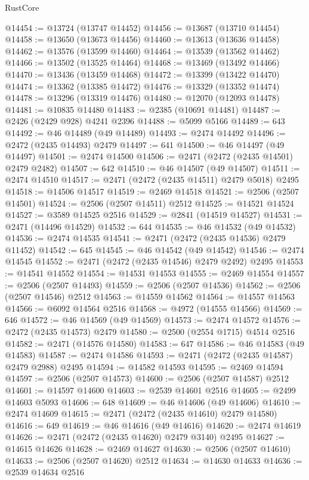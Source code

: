 \begin{lexlean}{RustCore}
\begin{coremodule}
@14454 := @13724 (@13747 @14452)
@14456 := @13687 (@13710 @14454)
@14458 := @13650 (@13673 @14456)
@14460 := @13613 (@13636 @14458)
@14462 := @13576 (@13599 @14460)
@14464 := @13539 (@13562 @14462)
@14466 := @13502 (@13525 @14464)
@14468 := @13469 (@13492 @14466)
@14470 := @13436 (@13459 @14468)
@14472 := @13399 (@13422 @14470)
@14474 := @13362 (@13385 @14472)
@14476 := @13329 (@13352 @14474)
@14478 := @13296 (@13319 @14476)
@14480 := @12070 (@12093 @14478)
@14481 := @10835 @14480
@14483 := @2385 (@10691 @14481)
@14487 := @2426 (@2429 @928) @4241 @2396
@14488 := @5099 @5166
@14489 := 643
@14492 := @46 @14489 (@49 @14489)
@14493 := @2474 @14492
@14496 := @2472 (@2435 @14493) @2479
@14497 := 641
@14500 := @46 @14497 (@49 @14497)
@14501 := @2474 @14500
@14506 := @2471 (@2472 (@2435 @14501) @2479 @2482)
@14507 := 642
@14510 := @46 @14507 (@49 @14507)
@14511 := @2474 @14510
@14517 := @2471 (@2472 (@2435 @14511) @2479 @5018) @2495
@14518 := @14506 @14517
@14519 := @2469 @14518
@14521 := @2506 (@2507 @14501)
@14524 := @2506 (@2507 @14511) @2512
@14525 := @14521 @14524
@14527 := @3589 @14525 @2516
@14529 := @2841 (@14519 @14527)
@14531 := @2471 (@14496 @14529)
@14532 := 644
@14535 := @46 @14532 (@49 @14532)
@14536 := @2474 @14535
@14541 := @2471 (@2472 (@2435 @14536) @2479 @11452)
@14542 := 645
@14545 := @46 @14542 (@49 @14542)
@14546 := @2474 @14545
@14552 := @2471 (@2472 (@2435 @14546) @2479 @2492) @2495
@14553 := @14541 @14552
@14554 := @14531 @14553
@14555 := @2469 @14554
@14557 := @2506 (@2507 @14493)
@14559 := @2506 (@2507 @14536)
@14562 := @2506 (@2507 @14546) @2512
@14563 := @14559 @14562
@14564 := @14557 @14563
@14566 := @6092 @14564 @2516
@14568 := @4972 (@14555 @14566)
@14569 := 646
@14572 := @46 @14569 (@49 @14569)
@14573 := @2474 @14572
@14576 := @2472 (@2435 @14573) @2479
@14580 := @2500 (@2554 @1715) @4514 @2516
@14582 := @2471 (@14576 @14580)
@14583 := 647
@14586 := @46 @14583 (@49 @14583)
@14587 := @2474 @14586
@14593 := @2471 (@2472 (@2435 @14587) @2479 @2988) @2495
@14594 := @14582 @14593
@14595 := @2469 @14594
@14597 := @2506 (@2507 @14573)
@14600 := @2506 (@2507 @14587) @2512
@14601 := @14597 @14600
@14603 := @2539 @14601 @2516
@14605 := @2499 @14603 @5093
@14606 := 648
@14609 := @46 @14606 (@49 @14606)
@14610 := @2474 @14609
@14615 := @2471 (@2472 (@2435 @14610) @2479 @14580)
@14616 := 649
@14619 := @46 @14616 (@49 @14616)
@14620 := @2474 @14619
@14626 := @2471 (@2472 (@2435 @14620) @2479 @3140) @2495
@14627 := @14615 @14626
@14628 := @2469 @14627
@14630 := @2506 (@2507 @14610)
@14633 := @2506 (@2507 @14620) @2512
@14634 := @14630 @14633
@14636 := @2539 @14634 @2516

\end{coremodule}
\end{lexlean}
